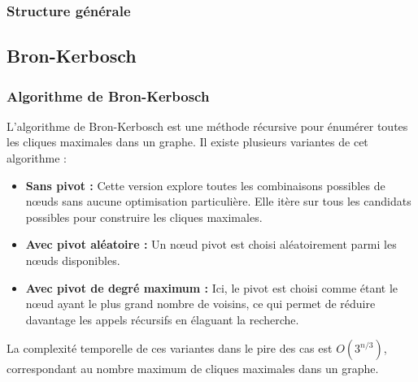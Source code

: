\documentclass{beamer}
\begin{document}
\begin{frame}
  \frametitle{Structure générale}
  \begin{center}
  \end{center}
\end{frame}

\subsection{Bron-Kerbosch}
\begin{frame}
\frametitle{Algorithme de Bron-Kerbosch}
L'algorithme de Bron-Kerbosch est une méthode récursive pour énumérer toutes les cliques maximales dans un graphe. Il existe plusieurs variantes de cet algorithme :
\begin{itemize}
    \item \textbf{Sans pivot :} Cette version explore toutes les combinaisons possibles de nœuds sans aucune optimisation particulière. Elle itère sur tous les candidats possibles pour construire les cliques maximales.
  \item \textbf{Avec pivot aléatoire :} Un nœud pivot est choisi aléatoirement parmi les nœuds disponibles.
  \item \textbf{Avec pivot de degré maximum :} Ici, le pivot est choisi comme étant le nœud ayant le plus grand nombre de voisins, ce qui permet de réduire davantage les appels récursifs en élaguant la recherche.
\end{itemize}
La complexité temporelle de ces variantes dans le pire des cas est \(O(3^{n/3})\), correspondant au nombre maximum de cliques maximales dans un graphe.
\end{frame}
\end{document}
